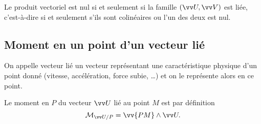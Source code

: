 Le produit vectoriel est nul si et seulement si la famille \((\vU,\vV)\) est liée, c'est-à-dire si et seulement s'ils sont colinéaires ou l'un des deux est nul.

\subsection{Moment en un point d'un vecteur lié}
\label{chap1-sec:momentenunpointdunvecteurlié}

On appelle vecteur lié un vecteur représentant une caractéristique physique d'un point donné (vitesse, accélération, force subie, \ldots) et on le représente alors en ce point.

Le moment en \(P\) du vecteur \(\vU\) lié au point \(M\) est par définition
\begin{equation}
  \Mom{P}{\vU}=\vv{PM}\wedge\vU.
\end{equation}

